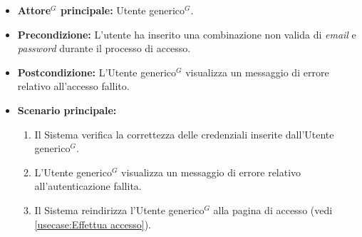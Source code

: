 \label{usecase:Visualizzazione errore d'accesso}

\begin{itemize}
	\item \textbf{\gls{Attore}$^G$ principale:} \gls{Utente generico}$^G$.
	\item \textbf{Precondizione:}
    L'utente ha inserito una combinazione non valida di \textit{email} e \textit{password} durante il processo di accesso.
	\item \textbf{Postcondizione:} L'\gls{Utente generico}$^G$ visualizza un messaggio di errore relativo all'accesso fallito.

	\item \textbf{Scenario principale:}
	\begin{enumerate}
        \item Il Sistema verifica la correttezza delle credenziali inserite dall'\gls{Utente generico}$^G$.
        \item L'\gls{Utente generico}$^G$ visualizza un messaggio di errore relativo all'autenticazione fallita.
        \item Il Sistema reindirizza l'\gls{Utente generico}$^G$ alla pagina di accesso (vedi \autoref{usecase:Effettua accesso}).
    \end{enumerate}
	
\end{itemize}
